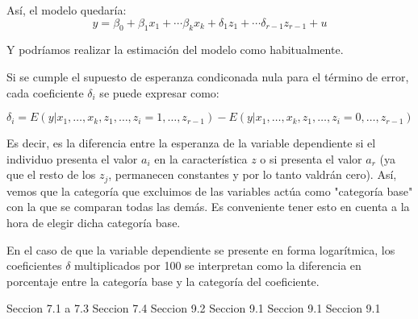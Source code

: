 As\'i, el modelo quedar\'ia:
\[y=\beta_0+\beta_1x_1+\cdots\beta_kx_k+\delta_1z_1+\cdots\delta_{r-1}z_{r-1}+u\]

Y podr\'iamos realizar la estimaci\'on del modelo como habitualmente.


Si se cumple el supuesto de esperanza condiconada nula para el t\'ermino de error, cada coeficiente $\delta_i$ se puede expresar como:

\[\delta_i=E(y|x_1,\ldots,x_k,z_1,\ldots,z_i=1,\ldots,z_{r-1})-E(y|x_1,\ldots,x_k,z_1,\ldots,z_i=0,\ldots,z_{r-1})\]

Es decir, es la diferencia entre la esperanza de la variable dependiente si el individuo presenta el valor $a_i$ en la caracter\'istica $z$ o si presenta el valor $a_r$ (ya que el resto de los $z_j$, permanecen constantes y por lo tanto valdr\'an cero). As\'i, vemos que la categor\'ia que excluimos de las variables act\'ua como "categor\'ia base" con la que se comparan todas las dem\'as. Es conveniente tener esto en cuenta a la hora de elegir dicha categor\'ia base.

En el caso de que la variable dependiente se presente en forma logar\'itmica, los coeficientes $\delta$ multiplicados por 100 se interpretan como la diferencia en porcentaje entre la categor\'ia base y la categor\'ia del coeficiente.



Seccion 7.1 a 7.3
Seccion 7.4
Seccion 9.2
Seccion 9.1
Seccion 9.1
Seccion 9.1